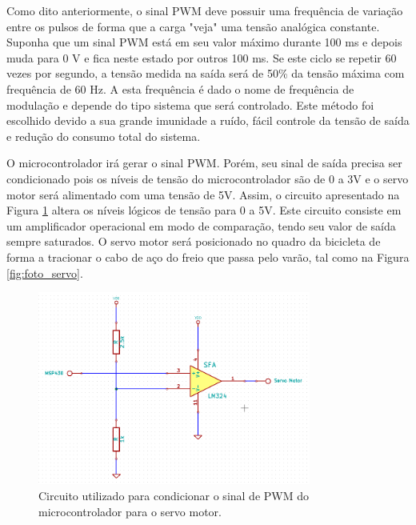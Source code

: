Como dito anteriormente, o sinal PWM deve possuir uma frequência de variação entre os pulsos de forma que a carga "veja" uma tensão analógica constante. Suponha que um sinal PWM está em seu valor máximo durante 100 ms e depois muda para 0 V e fica neste estado por outros 100 ms. Se este ciclo se repetir 60 vezes por segundo, a tensão medida na saída será de 50\% da tensão máxima com frequência de 60 Hz. A esta frequência é dado o nome de frequência de modulação e depende do tipo sistema que será controlado.
Este método foi escolhido devido a sua grande imunidade a ruído, fácil controle da tensão de saída e redução do consumo total do sistema.

O microcontrolador irá gerar o sinal PWM. Porém, seu sinal de saída precisa ser condicionado pois os níveis de tensão do microcontrolador são de 0 a 3V e o servo motor será alimentado com uma tensão de 5V. Assim, o circuito apresentado na Figura \ref{fig:circ_serv} altera os níveis lógicos de tensão para 0 a 5V. Este circuito consiste em um amplificador operacional em modo de comparação, tendo seu valor de saída sempre saturados. O servo motor será posicionado no quadro da bicicleta de forma a tracionar o cabo de aço do freio que passa pelo varão, tal como na Figura \ref{fig:foto_servo}.

\begin{figure}[h]
  \centering
	\includegraphics[width=0.8\textwidth]{figuras/circuitoPWM.png}
  \caption{Circuito utilizado para condicionar o sinal de PWM do microcontrolador para o servo motor.}
  \label{fig:circ_serv}
\end{figure}

